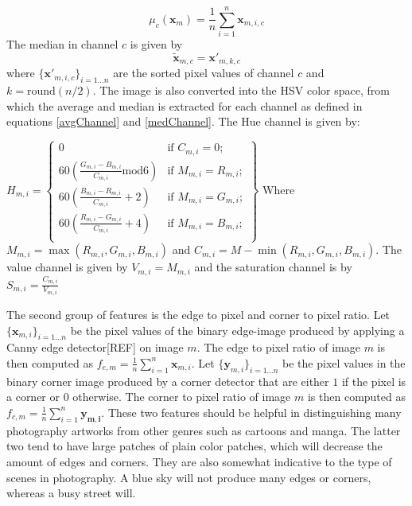 \begin{equation}
\label{avgChannel}
\mu_c(\mathbf{x}_{m}) = \frac{1}{n}\sum_{i=1}^{n} \mathbf{x}_{m,i,c} 
\end{equation}
The median in channel $c$ is given by 
\begin{equation}
\label{medChannel}
\tilde{\mathbf{x}}_{m,c} = \mathbf{x'}_{m,k,c}
\end{equation}
where $\{\mathbf{x'}_{m,i,c}\}_{i = 1\dots n}$ are the sorted pixel values of channel $c$ and $k = \mbox{round}(n/2)$.
The image is also converted into the HSV color space, from which the average and median is extracted for each channel as defined in equations \ref{avgChannel} and \ref{medChannel}. The Hue channel is given by: 

$H_{m,i} = \left\{ 
\begin{array}{ll}
0 & \mbox{if $C_{m,i} = 0$};\\
60 \left(\frac{G_{m,i}-B_{m,i}}{C_{m,i}} \mbox{mod} 6 \right) & \mbox{if $M_{m,i} = R_{m,i}$};\\
60 \left(\frac{B_{m,i}-R_{m,i}}{C_{m,i}} + 2 \right) & \mbox{if $M_{m,i} = G_{m,i}$};\\
60 \left(\frac{R_{m,i}-G_{m,i}}{C_{m,i}} + 4 \right) & \mbox{if $M_{m,i} = B_{m,i}$}; \\
\end{array} 
\right\}$
Where $M_{m,i} = \max(R_{m,i},G_{m,i},B_{m,i})$ and $C_{m,i} =  M - \min(R_{m,i},G_{m,i},B_{m,i})$. The value channel is given by $V_{m,i} =  M_{m,i}$ and the saturation channel is  by $S_{m,i} = \frac{C_{m,i}}{V_{m,i}}$

The second group of features is the edge to pixel and corner to pixel ratio. Let $\{\mathbf{x}_{m,i} \}_{i=1\dots n}$ be the pixel values of the binary edge-image produced by applying a Canny edge detector[REF] on image $m$. The edge to pixel ratio of image $m$ is then computed as $f_{e,m} = \frac{1}{n}\sum_{i=1}^{n} \mathbf{x}_{m,i} $. Let $\{\mathbf{y}_{m,i} \}_{i=1\dots n}$ be the pixel values in the binary corner image produced by a corner detector that are either $1$ if the pixel is a corner or $0$ otherwise. The corner to pixel ratio of image $m$ is then computed as  $f_{c,m} = \frac{1}{n}\sum_{i=1}^{n} \mathbf{y_{m,i}} $. These two features should be helpful in distinguishing many photography artworks from other genres such as cartoons and manga. The latter two tend to have large patches of plain color patches, which will decrease the amount of edges and corners. They are also somewhat indicative to the type of scenes in photography. A blue sky will not produce many edges or corners, whereas a busy street will.  

